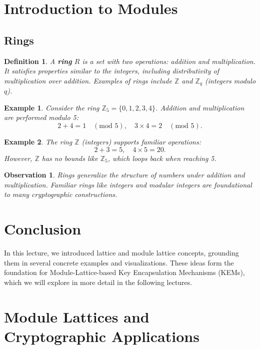 \documentclass[12pt]{article}
\newtheorem{definition}{Definition}
\newtheorem{example}{Example}
\newtheorem{observation}{Observation}
\begin{document}
	\section{Introduction to Modules}
	
	\subsection{Rings}
	
	\begin{definition}
		A \textbf{ring} $R$ is a set with two operations: addition and multiplication. It satisfies properties similar to the integers, including distributivity of multiplication over addition. Examples of rings include $\mathbb{Z}$ and $\mathbb{Z}_q$ (integers modulo $q$).
	\end{definition}
	
	\begin{example}
		Consider the ring $\mathbb{Z}_5 = \{0, 1, 2, 3, 4\}$. Addition and multiplication are performed modulo 5:
		\[
		2 + 4 = 1 \quad (\text{mod } 5), \quad 3 \times 4 = 2 \quad (\text{mod } 5).
		\]
	\end{example}
	
	\begin{example}
		The ring $\mathbb{Z}$ (integers) supports familiar operations:
		\[
		2 + 3 = 5, \quad 4 \times 5 = 20.
		\]
		However, $\mathbb{Z}$ has no bounds like $\mathbb{Z}_5$, which loops back when reaching 5.
	\end{example}
	
	\begin{observation}
		Rings generalize the structure of numbers under addition and multiplication. Familiar rings like integers and modular integers are foundational to many cryptographic constructions.
	\end{observation}
	
	\section{Conclusion}
	
	In this lecture, we introduced lattice and module lattice concepts, grounding them in several concrete examples and visualizations. These ideas form the foundation for Module-Lattice-based Key Encapsulation Mechanisms (KEMs), which we will explore in more detail in the following lectures.
	
	\newpage
	
	\section{Module Lattices and Cryptographic Applications}
	
\end{document}
